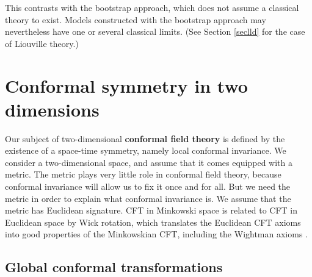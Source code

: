 \documentclass[12pt, a4paper, notitlepage, twoside]{report}
\numberwithin{equation}{section}
\theoremstyle{break}
\begin{document}
This contrasts with the bootstrap approach, which does not assume a classical theory to exist.
Models constructed with the bootstrap approach may nevertheless have one or several classical limits. (See Section \ref{seclld} for the case of Liouville theory.)

\section{Conformal symmetry in two dimensions \label{secconf}}

Our subject of two-dimensional \textbf{conformal field theory} is defined by the existence of a space-time symmetry, namely local conformal invariance. 
We consider a two-dimensional space, and assume that it comes equipped with a metric.
The metric plays very little role in conformal field theory, because conformal invariance will allow us to fix it once and for all.
But we need the metric in order to explain what conformal invariance is.
We assume that the metric has Euclidean signature. CFT in Minkowski space is related to CFT in Euclidean space by Wick rotation, which translates the Euclidean CFT axioms into good properties of the Minkowskian CFT, including the Wightman axioms \cite{kqr21}.

\subsection{Global conformal transformations\label{secglob}}
\end{document}
